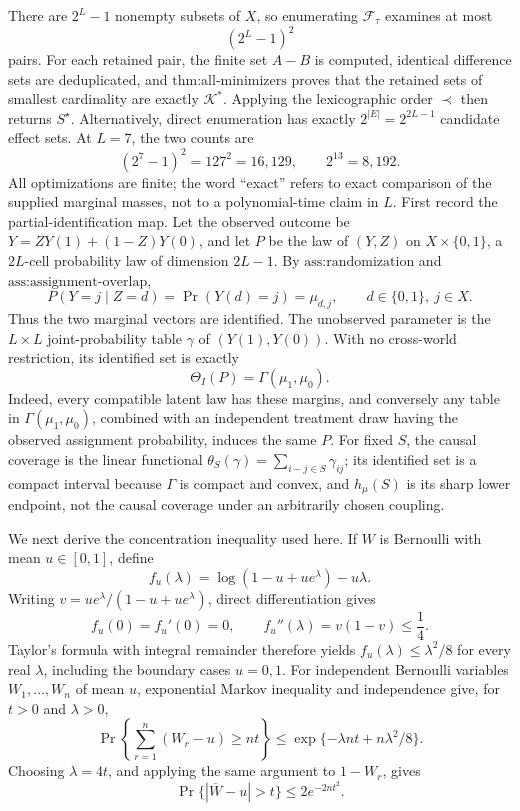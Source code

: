 There are \(2^L-1\) nonempty subsets of \(X\), so enumerating \(\mathcal F_{\tau}\) examines at most
\[
(2^L-1)^2
\]
pairs.  For each retained pair, the finite set \(A-B\) is computed, identical difference sets are deduplicated, and \(\text{thm:all-minimizers}\) proves that the retained sets of smallest cardinality are exactly \(\mathcal K^*\).  Applying the lexicographic order \(\prec\) then returns \(S^\star\).  Alternatively, direct enumeration has exactly \(2^{|E|}=2^{2L-1}\) candidate effect sets.  At \(L=7\), the two counts are
\[
(2^7-1)^2=127^2=16{,}129,
\qquad
2^{13}=8{,}192.
\]
All optimizations are finite; the word ``exact'' refers to exact comparison of the supplied marginal masses, not to a polynomial-time claim in \(L\).
First record the partial-identification map.  Let the observed outcome be \(Y=ZY(1)+(1-Z)Y(0)\), and let \(P\) be the law of \((Y,Z)\) on \(X\times\{0,1\}\), a \(2L\)-cell probability law of dimension \(2L-1\).  By \(\text{ass:randomization}\) and \(\text{ass:assignment-overlap}\),
\[
P(Y=j\mid Z=d)=\Pr(Y(d)=j)=\mu_{d,j},
\qquad d\in\{0,1\},\ j\in X.
\]
Thus the two marginal vectors are identified.  The unobserved parameter is the \(L\times L\) joint-probability table \(\gamma\) of \((Y(1),Y(0))\).  With no cross-world restriction, its identified set is exactly
\[
\Theta_I(P)=\Gamma(\mu_1,\mu_0).
\]
Indeed, every compatible latent law has these margins, and conversely any table in \(\Gamma(\mu_1,\mu_0)\), combined with an independent treatment draw having the observed assignment probability, induces the same \(P\).  For fixed \(S\), the causal coverage is the linear functional \(\theta_S(\gamma)=\sum_{i-j\in S}\gamma_{ij}\); its identified set is a compact interval because \(\Gamma\) is compact and convex, and \(h_{\mu}(S)\) is its sharp lower endpoint, not the causal coverage under an arbitrarily chosen coupling.

We next derive the concentration inequality used here.  If \(W\) is Bernoulli with mean \(u\in[0,1]\), define
\[
f_u(\lambda)=\log(1-u+ue^\lambda)-u\lambda.
\]
Writing \(v=ue^\lambda/(1-u+ue^\lambda)\), direct differentiation gives
\[
f_u(0)=f_u'(0)=0,
\qquad
f_u''(\lambda)=v(1-v)\leq\frac14.
\]
Taylor's formula with integral remainder therefore yields \(f_u(\lambda)\leq\lambda^2/8\) for every real \(\lambda\), including the boundary cases \(u=0,1\).  For independent Bernoulli variables \(W_1,\ldots,W_n\) of mean \(u\), exponential Markov inequality and independence give, for \(t>0\) and \(\lambda>0\),
\[
\Pr\!\left\{\sum_{r=1}^n(W_r-u)\geq nt\right\}
\leq\exp\{-\lambda nt+n\lambda^2/8\}.
\]
Choosing \(\lambda=4t\), and applying the same argument to \(1-W_r\), gives
\[
\Pr\{|\overline W-u|>t\}\leq2e^{-2nt^2}. \tag{1}
\]

